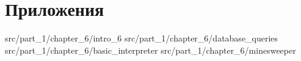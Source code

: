 \chapter{Приложения}
\label{chpt:applications}

 {src/part_1/chapter_6/intro_6}
 {src/part_1/chapter_6/database_queries}
 {src/part_1/chapter_6/basic_interpreter}
 {src/part_1/chapter_6/minesweeper}